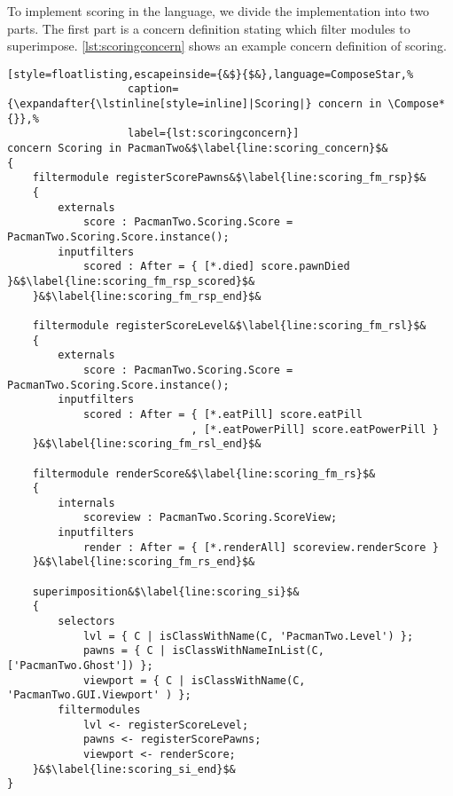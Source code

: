 To implement scoring in the \Compose* language, we divide the implementation into two parts.
The first part is a \Compose* concern definition stating which filter modules to superimpose.
\autoref{lst:scoringconcern} shows an example \Compose* concern definition of scoring.

\begin{lstlisting}[style=floatlisting,escapeinside={&$}{$&},language=ComposeStar,%
                   caption={\expandafter{\lstinline[style=inline]|Scoring|} concern in \Compose*{}},%
                   label={lst:scoringconcern}]
concern Scoring in PacmanTwo&$\label{line:scoring_concern}$&
{
	filtermodule registerScorePawns&$\label{line:scoring_fm_rsp}$&
	{
		externals
			score : PacmanTwo.Scoring.Score = PacmanTwo.Scoring.Score.instance();
		inputfilters
			scored : After = { [*.died] score.pawnDied }&$\label{line:scoring_fm_rsp_scored}$&
	}&$\label{line:scoring_fm_rsp_end}$&

	filtermodule registerScoreLevel&$\label{line:scoring_fm_rsl}$&
	{
		externals
			score : PacmanTwo.Scoring.Score = PacmanTwo.Scoring.Score.instance();
		inputfilters
			scored : After = { [*.eatPill] score.eatPill
			                 , [*.eatPowerPill] score.eatPowerPill }
	}&$\label{line:scoring_fm_rsl_end}$&

	filtermodule renderScore&$\label{line:scoring_fm_rs}$&
	{
		internals
			scoreview : PacmanTwo.Scoring.ScoreView;
		inputfilters
			render : After = { [*.renderAll] scoreview.renderScore }
	}&$\label{line:scoring_fm_rs_end}$&

	superimposition&$\label{line:scoring_si}$&
	{
		selectors
			lvl = { C | isClassWithName(C, 'PacmanTwo.Level') };
			pawns = { C | isClassWithNameInList(C, ['PacmanTwo.Ghost']) };
			viewport = { C | isClassWithName(C, 'PacmanTwo.GUI.Viewport' ) };
		filtermodules
			lvl <- registerScoreLevel;
			pawns <- registerScorePawns;
			viewport <- renderScore;
	}&$\label{line:scoring_si_end}$&
}
\end{lstlisting}

